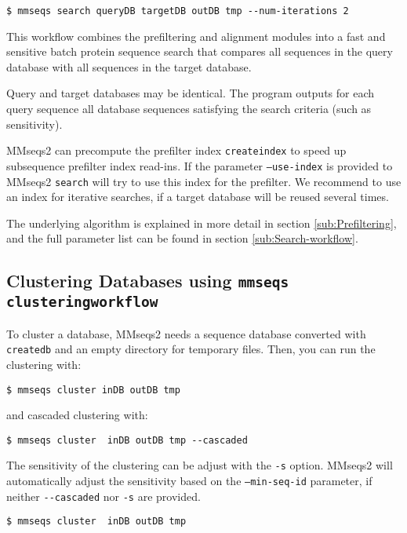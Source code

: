 \documentclass[11pt,a4paper]{scrreprt}
\begin{document}
\begin{verbatim}
$ mmseqs search queryDB targetDB outDB tmp --num-iterations 2
\end{verbatim}


This workflow combines the prefiltering and alignment modules into a fast and sensitive batch protein sequence search that compares all sequences in the query database with all sequences in the target database.

Query and target databases may be identical. The program outputs for each query sequence all database sequences satisfying the search criteria (such as sensitivity).

MMseqs2 can precompute the prefilter index \texttt{createindex} to speed up subsequence prefilter index read-ins. If the parameter \texttt{--use-index} is provided to MMseqs2 \texttt{search} will try to use this index for the prefilter. We recommend to use an index for iterative searches, if a target database will be reused several times.

The underlying algorithm is explained in more detail in section \ref{sub:Prefiltering}, and the full parameter list can be found in section \ref{sub:Search-workflow}.
\subsection{Clustering Databases using \texttt{mmseqs clusteringworkflow}} \label{sub:Clustering}
To cluster a database, MMseqs2 needs a sequence database converted with \texttt{createdb} and an empty directory for temporary files. Then, you can run the clustering with:

\begin{verbatim}
$ mmseqs cluster inDB outDB tmp
\end{verbatim}

and cascaded clustering with:

\begin{verbatim}
$ mmseqs cluster  inDB outDB tmp --cascaded
\end{verbatim}

The sensitivity of the clustering can be adjust with the \texttt{-s} option. MMseqs2 will automatically adjust the sensitivity based on the \texttt{--min-seq-id} parameter, if neither \texttt{-{}-cascaded} nor \texttt{-s} are  provided. 

\begin{verbatim}
$ mmseqs cluster  inDB outDB tmp 
\end{verbatim}
\end{document}
